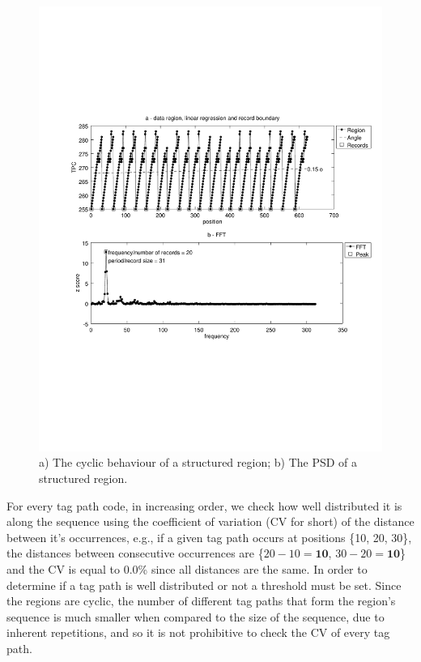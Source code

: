 \documentclass{vldb}
\begin{document}
\begin{figure}[h]
  \centering
     \includegraphics[trim={2.5cm 7.5cm 1cm 6.5cm}, width=\linewidth
     ]{img/fftreg.pdf}
  \caption{a) The cyclic behaviour of a structured region; b) The PSD of a
  structured region.}
  \label{fig:fftreg}
\end{figure}

For every tag path code, in increasing order, we check how well distributed it
is along the sequence using the coefficient of variation (CV for short) of the
distance between it's occurrences, e.g., if a given tag path occurs at positions
\{10, 20, 30\}, the distances between consecutive occurrences are \{$20-10 =
\textbf{10}$, $30-20 = \textbf{10}$\} and the CV is equal to 0.0\% since all
distances are the same. In order to determine if a tag path is well distributed
or not a threshold must be set. Since the regions are cyclic, the number of
different tag paths that form the region's sequence is much smaller when
compared to the size of the sequence, due to inherent repetitions, and so it is
not prohibitive to check the CV of every tag path.
\end{document}
